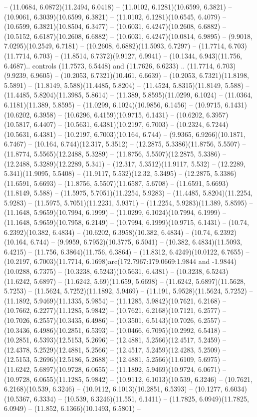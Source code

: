 -- (11.0684, 6.0872)(11.2494, 6.0418) -- (11.0102, 6.1281)(10.6599, 6.3821) -- (10.9061, 6.3039)(10.6599, 6.3821) -- (11.0102, 6.1281)(10.6545, 6.4079) -- (10.6599, 6.3821)(10.8504, 6.3477) -- (10.6031, 6.4247)(10.2608, 6.6882) -- (10.5152, 6.6187)(10.2608, 6.6882) -- (10.6031, 6.4247)(10.0814, 6.9895) -- (9.9018, 7.0295)(10.2549, 6.7181) -- (10.2608, 6.6882)(11.5093, 6.7297) -- (11.7714, 6.703)(11.7714, 6.703) -- (11.8514, 6.7372)(9.9127, 6.9941) -- (10.1344, 6.943)(11.756, 6.4687).. controls (11.7573, 6.5448) and (11.7626, 6.6233) .. (11.7714, 6.703)(9.9239, 6.9605) -- (10.2053, 6.7321)(10.461, 6.6639) -- (10.2053, 6.7321)(11.8198, 5.5891) -- (11.8149, 5.588)(11.4485, 5.8204) -- (11.4524, 5.8315)(11.8149, 5.588) -- (11.4485, 5.8204)(11.3985, 5.8614) -- (11.389, 5.8595)(11.0299, 6.1024) -- (11.0364, 6.1181)(11.389, 5.8595) -- (11.0299, 6.1024)(10.9856, 6.1456) -- (10.9715, 6.1431)(10.6202, 6.3958) -- (10.6296, 6.4159)(10.9715, 6.1431) -- (10.6202, 6.3957)(10.5817, 6.4407) -- (10.5631, 6.4381)(10.2197, 6.7003) -- (10.2324, 6.7244)(10.5631, 6.4381) -- (10.2197, 6.7003)(10.164, 6.744) -- (9.9365, 6.9266)(10.1871, 6.7467) -- (10.164, 6.744)(12.317, 5.3512) -- (12.2875, 5.3386)(11.8756, 5.5507) -- (11.8774, 5.5565)(12.2488, 5.3289) -- (11.8756, 5.5507)(12.2875, 5.3386) -- (12.2488, 5.3289)(12.2289, 5.341) -- (12.317, 5.3512)(11.9117, 5.532) -- (12.2289, 5.341)(11.9095, 5.5408) -- (11.9117, 5.532)(12.32, 5.3495) -- (12.2875, 5.3386)(11.6591, 5.6693) -- (11.8756, 5.5507)(11.6587, 5.6708) -- (11.6591, 5.6693)(11.8149, 5.588) -- (11.5975, 5.7051)(11.2254, 5.9283) -- (11.4485, 5.8204)(11.2254, 5.9283) -- (11.5975, 5.7051)(11.2231, 5.9371) -- (11.2254, 5.9283)(11.389, 5.8595) -- (11.1648, 5.9659)(10.7994, 6.1999) -- (11.0299, 6.1024)(10.7994, 6.1999) -- (11.1648, 5.9659)(10.7958, 6.2149) -- (10.7994, 6.1999)(10.9715, 6.1431) -- (10.74, 6.2392)(10.382, 6.4834) -- (10.6202, 6.3958)(10.382, 6.4834) -- (10.74, 6.2392)(10.164, 6.744) -- (9.9959, 6.7952)(10.3775, 6.5041) -- (10.382, 6.4834)(11.5093, 6.4215) -- (11.756, 6.3864)(11.756, 6.3864) -- (11.8312, 6.4249)(10.0122, 6.7655) -- (10.2197, 6.7003)(11.7714, 6.1698)arc(172.7967:179.0669:1.9844 and -1.9844)(10.0288, 6.7375) -- (10.3238, 6.5243)(10.5631, 6.4381) -- (10.3238, 6.5243)(11.6242, 5.6897) -- (11.6242, 5.69)(11.659, 5.6698) -- (11.6242, 5.6897)(11.5628, 5.7253) -- (11.5624, 5.7252)(11.1892, 5.9469) -- (11.191, 5.9528)(11.5624, 5.7252) -- (11.1892, 5.9469)(11.1335, 5.9854) -- (11.1285, 5.9842)(10.7621, 6.2168) -- (10.7662, 6.2277)(11.1285, 5.9842) -- (10.7621, 6.2168)(10.7121, 6.2577) -- (10.7026, 6.2557)(10.3435, 6.4986) -- (10.3501, 6.5143)(10.7026, 6.2557) -- (10.3436, 6.4986)(10.2851, 6.5393) -- (10.0466, 6.7095)(10.2992, 6.5418) -- (10.2851, 6.5393)(12.5153, 5.2696) -- (12.4881, 5.2566)(12.4517, 5.2459) -- (12.4378, 5.2529)(12.4881, 5.2566) -- (12.4517, 5.2459)(12.4283, 5.2509) -- (12.5153, 5.2696)(12.5186, 5.2688) -- (12.4881, 5.2566)(11.6109, 5.6975) -- (11.6242, 5.6897)(10.9728, 6.0655) -- (11.1892, 5.9469)(10.9724, 6.0671) -- (10.9728, 6.0655)(11.1285, 5.9842) -- (10.9112, 6.1013)(10.539, 6.3246) -- (10.7621, 6.2168)(10.539, 6.3246) -- (10.9112, 6.1013)(10.2851, 6.5393) -- (10.1277, 6.6034)(10.5367, 6.3334) -- (10.539, 6.3246)(11.551, 6.1411) -- (11.7825, 6.0949)(11.7825, 6.0949) -- (11.852, 6.1366)(10.1493, 6.5801) -- 